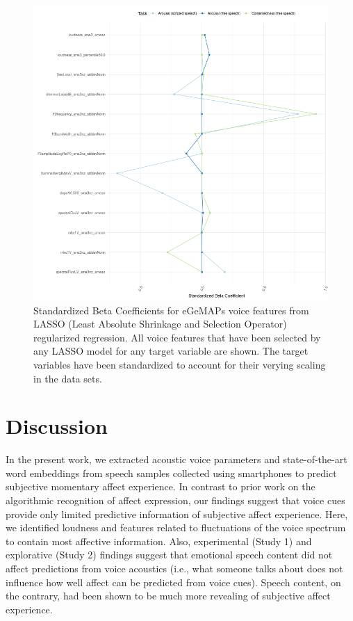 \documentclass[
  english,
  man,floatsintext]{apa6}
\begin{document}
\begin{figure}

{\centering \includegraphics[width=1\linewidth,height=1\textheight]{../figures/betas_plot} 

}

\caption[LASSO betas]{Standardized Beta Coefficients for eGeMAPs voice features from LASSO (Least Absolute Shrinkage and Selection Operator) regularized regression. All voice features that have been selected by any LASSO model for any target variable are shown. The target variables have been standardized to account for their verying scaling in the data sets.}\label{fig:lassobetas}
\end{figure}

\newpage

\hypertarget{discussion}{%
\section{Discussion}\label{discussion}}

In the present work, we extracted acoustic voice parameters and state-of-the-art word embeddings from speech samples collected using smartphones to predict subjective momentary affect experience. In contrast to prior work on the algorithmic recognition of affect expression, our findings suggest that voice cues provide only limited predictive information of subjective affect experience. Here, we identified loudness and features related to fluctuations of the voice spectrum to contain most affective information. Also, experimental (Study 1) and explorative (Study 2) findings suggest that emotional speech content did not affect predictions from voice acoustics (i.e., what someone talks about does not influence how well affect can be predicted from voice cues). Speech content, on the contrary, had been shown to be much more revealing of subjective affect experience.
\end{document}

